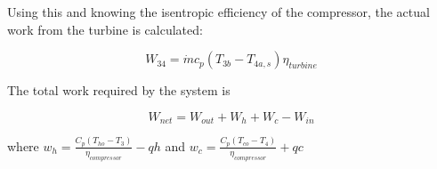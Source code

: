 \documentclass{article}
\begin{document}

Using this and knowing the isentropic efficiency of the compressor, the actual work from the turbine is calculated:

\begin{equation}
    W_{34} = \dot{m} c_p (T_{3b} - T_{4a,s}) \eta_{turbine}
\end{equation} 



The total work required by the system is

\begin{equation}
W_{net} = W_{out} + W_h + W_c - W_{in}
\end{equation}

where $w_h=\frac{C_p(T_{ho} - T_{3})}{\eta_{compressor}} - qh$ and $w_c=\frac{C_p(T_{co} - T_{4})}{\eta_{compressor}} + qc$
\end{document}

